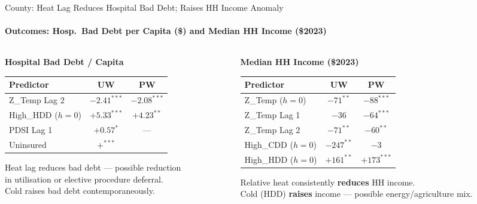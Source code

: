 \documentclass[aspectratio=169,11pt]{beamer}
\newcommand{\emphcolor}[1]{{\color{WarmOrange}\textbf{#1}}}
\newcommand{\tealtext}[1]{{\color{Teal}#1}}
\newcommand{\graytext}[1]{{\color{WarmGray}#1}}
\begin{document}
\begin{frame}{County: Heat Lag Reduces Hospital Bad Debt; Raises HH Income Anomaly}
  \framesubtitle{Outcomes: Hosp.\ Bad Debt per Capita (\$) and Median HH Income (\$2023)}
  \small
  \begin{columns}[T]
    \begin{column}{0.47\textwidth}
      \tealtext{\textbf{Hospital Bad Debt / Capita}}\\[0.3em]
      \begin{tabular}{lcc}
        \toprule
        Predictor & UW & PW \\
        \midrule
        Z\_Temp Lag 2 & \emphcolor{$-2.41^{***}$} & \emphcolor{$-2.08^{***}$} \\
        High\_HDD ($h{=}0$) & \emphcolor{$+5.33^{***}$} & \emphcolor{$+4.23^{**}$} \\
        PDSI Lag 1 & $+0.57^{*}$ & — \\
        Uninsured & \emphcolor{$+^{***}$} & \\
        \bottomrule
      \end{tabular}
      \vspace{0.4em}
      \graytext{\scriptsize Heat lag reduces bad debt — possible reduction\\in utilisation or elective procedure deferral.\\Cold raises bad debt contemporaneously.}
    \end{column}
    \begin{column}{0.47\textwidth}
      \tealtext{\textbf{Median HH Income (\$2023)}}\\[0.3em]
      \begin{tabular}{lcc}
        \toprule
        Predictor & UW & PW \\
        \midrule
        Z\_Temp ($h{=}0$)  & $-71^{**}$ & \emphcolor{$-88^{***}$} \\
        Z\_Temp Lag 1       & $-36$ & \emphcolor{$-64^{***}$} \\
        Z\_Temp Lag 2       & \emphcolor{$-71^{**}$} & \emphcolor{$-60^{**}$} \\
        High\_CDD ($h{=}0$) & \emphcolor{$-247^{**}$} & $-3$ \\
        High\_HDD ($h{=}0$) & $+161^{**}$ & \emphcolor{$+173^{***}$} \\
        \bottomrule
      \end{tabular}
      \vspace{0.3em}
      \graytext{\scriptsize Relative heat consistently \emphcolor{reduces} HH income.\\Cold (HDD) \emphcolor{raises} income — possible energy/agriculture mix.}
    \end{column}
  \end{columns}
\end{frame}
\end{document}
